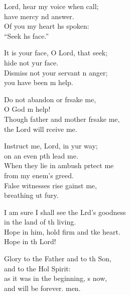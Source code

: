 \settowidth{\versewidth}{I am sure I shall see the Lord’s goodness *}
\begin{psalmverse}%
  \begin{patverse}
 Lord, hear my voice when  call;\Med\\
have mercy nd answer.\\
Of you my heart hs spoken:\Med\\
“Seek h\pointup{\i}s face.”

It is your face, O Lord, that  seek;\Med\\
hide not yur face.\\
Dismiss not your servant \pointup{\i}n anger;\Med\\
you have been m help.

Do not abandon or frsake me,\Med\\
O God m help!\\
Though father and mother frsake me,\Med\\
the Lord will rceive me.

Instruct me, Lord, in yur way;\Med\\
on an even pth lead me.\\
When they lie in ambush prtect me\Med\\
from my enem’s greed.\\
False witnesses rise gainst me,\Med\\
breathing ut fury.

I am sure I shall see the Lrd’s goodness\Med\\
in the land of th living.\\
Hope in him, hold firm and tke heart.\Med\\
Hope in th Lord!

Glory to the Father and to th Son,\Med\\
and to the Hol Spirit:\\
as it was in the beginning, \pointup{\i}s now,\Med\\
and will be forever. men.
  \end{patverse}
\end{psalmverse}
